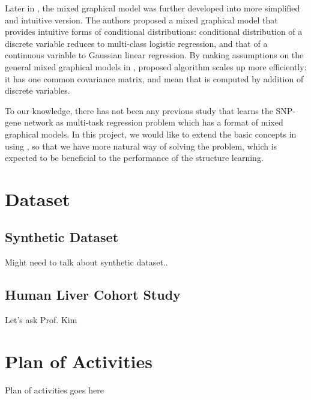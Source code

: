 \documentclass{article}
\begin{document}
Later in \cite{lee2013structure}, the mixed graphical model was further developed into more simplified and intuitive version. The authors proposed a mixed graphical model that provides intuitive forms of conditional distributions: conditional distribution of a discrete variable reduces to multi-class logistic regression, and that of a continuous variable to Gaussian linear regression. 
By making assumptions on the general mixed graphical models in \cite{lauritzen1989graphical}, proposed algorithm scales up more efficiently: it has one common covariance matrix, and mean that is computed by addition of discrete variables.


To our knowledge, there has not been any previous study that learns the SNP-gene network as multi-task regression problem which has a format of mixed graphical models. 
In this project, we would like to extend the basic concepts in \cite{sohn2012joint} using \cite{lee2013structure}, so that we have more natural way of solving the problem, which is expected to be beneficial to the performance of the structure learning.





\section{Dataset}

\subsection{Synthetic Dataset}
Might need to talk about synthetic dataset..

\subsection{Human Liver Cohort Study}
Let's ask Prof. Kim

\section{Plan of Activities}
Plan of activities goes here


\clearpage

\nocite{*}


\end{document}

